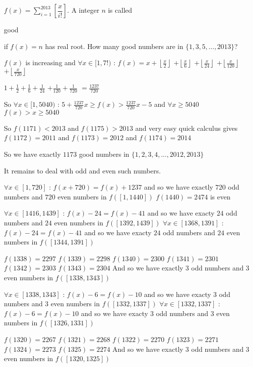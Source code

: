 \begin{solution}
	\begin{tcolorbox}$f(x)=\sum\limits_{i=1}^{2013}\left[\dfrac{x}{i!}\right]$. A integer $n$ is called \begin{italicized}good\end{italicized} if $f(x)=n$ has real root. How many good numbers are  in $\{1,3,5,\dotsc,2013\}$?\end{tcolorbox}
$f(x)$ is increasing and $\forall x\in [1,7!)$ : 
$f(x)=x+\left\lfloor\frac x2\right\rfloor$ $+\left\lfloor\frac x6\right\rfloor$ $+\left\lfloor\frac x{24}\right\rfloor$ $+\left\lfloor\frac x{120}\right\rfloor$ $+\left\lfloor\frac x{720}\right\rfloor$ 

$1+\frac 12+\frac 16+\frac 1{24}$ $+\frac 1{120}+\frac 1{720}$ $=\frac {1237}{720}$

So $\forall x\in[1,5040)$ : $5+\frac {1237}{720}x\ge f(x)> \frac {1237}{720}x-5$ and $\forall x\ge 5040$ $f(x)>x\ge 5040$

So $f(1171)<2013$ and $f(1175)>2013$ and very easy quick calculus gives $f(1172)=2011$ and $f(1173)=2012$ and $f(1174)=2014$

So we have exactly $1173$ good numbers in $\{1,2,3,4,...,2012,2013\}$

It remains to deal with odd and even such numbers.

$\forall x\in[1,720]$ : $f(x+720)=f(x)+1237$ and so we have exactly $720$ odd numbers and $720$ even numbers in $f([1,1440])$
$f(1440)=2474$ is even

$\forall x\in[1416,1439]$ : $f(x)-24=f(x)-41$ and so we have exacty $24$ odd numbers and $24$ even numbers in $f([1392,1439])$
$\forall x\in[1368,1391]$ : $f(x)-24=f(x)-41$ and so we have exacty $24$ odd numbers and $24$ even numbers in $f([1344,1391])$

$f(1338)=2297$
$f(1339)=2298$
$f(1340)=2300$
$f(1341)=2301$
$f(1342)=2303$
$f(1343)=2304$
And so we have exactly $3$ odd numbers and $3$ even numbers in $f([1338,1343])$

$\forall x\in[1338,1343]$ : $f(x)-6=f(x)-10$ and so we have exacty $3$ odd numbers and $3$ even numbers in $f([1332,1337])$
$\forall x\in[1332,1337]$ : $f(x)-6=f(x)-10$ and so we have exacty $3$ odd numbers and $3$ even numbers in $f([1326,1331])$

$f(1320)=2267$
$f(1321)=2268$
$f(1322)=2270$
$f(1323)=2271$
$f(1324)=2273$
$f(1325)=2274$
And so we have exactly $3$ odd numbers and $3$ even numbers in $f([1320,1325])$


\end{solution}
